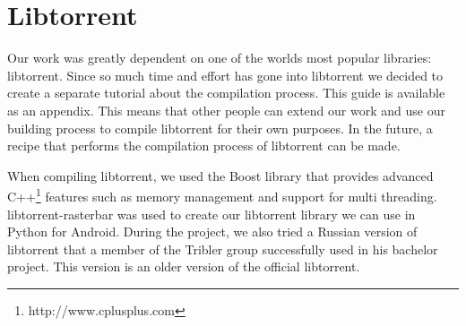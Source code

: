 \section{Libtorrent}
	Our work was greatly dependent on one of the worlds most popular libraries: libtorrent. Since so much time and effort has gone into libtorrent  we decided to create a separate tutorial about the compilation process. This guide is available as an appendix. This means that other people can extend our work and use our building process to compile libtorrent for their own purposes. In the future, a recipe that performs the compilation process of libtorrent can be made.
	
	When compiling libtorrent, we used the Boost library that provides advanced C++\footnote{http://www.cplusplus.com} features such as memory management and support for multi threading. libtorrent-rasterbar was used to create our libtorrent library we can use in Python for Android. During the project, we also tried a Russian version of libtorrent that a member of the Tribler group successfully used in his bachelor project. This version is an older version of the official libtorrent.